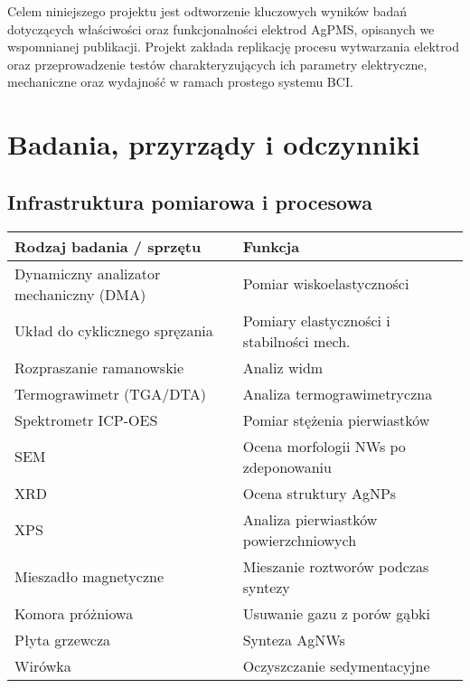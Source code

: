 \documentclass[12pt,a4paper]{article}
\begin{document}
Celem niniejszego projektu jest odtworzenie kluczowych wyników badań dotyczących właściwości oraz funkcjonalności elektrod AgPMS, opisanych we wspomnianej publikacji. Projekt zakłada replikację procesu wytwarzania elektrod oraz przeprowadzenie testów charakteryzujących ich parametry elektryczne, mechaniczne oraz wydajność w ramach prostego systemu BCI.

\section{Badania, przyrządy i odczynniki}
\subsection{Infrastruktura pomiarowa i procesowa}
\begin{table}[H]
    \centering
    \begin{tabular}{@{}ll@{}}
        \toprule
        \textbf{Rodzaj badania / sprzętu}       & \textbf{Funkcja}                          \\
        \midrule
        Dynamiczny analizator mechaniczny (DMA) & Pomiar wiskoelastyczności                 \\
        Układ do cyklicznego spręzania          & Pomiary elastyczności i stabilności mech. \\
        Rozpraszanie ramanowskie                & Analiz widm                               \\
        Termograwimetr (TGA/DTA)                & Analiza termograwimetryczna               \\
        Spektrometr ICP-OES                     & Pomiar stężenia pierwiastków              \\
        SEM                                     & Ocena morfologii NWs po zdeponowaniu      \\
        XRD                                     & Ocena struktury AgNPs                     \\
        XPS                                     & Analiza pierwiastków powierzchniowych     \\
        \midrule
        Mieszadło magnetyczne                   & Mieszanie roztworów podczas syntezy       \\
        Komora próżniowa                        & Usuwanie gazu z porów gąbki               \\
        Płyta grzewcza                          & Synteza AgNWs                             \\
        Wirówka                                 & Oczyszczanie sedymentacyjne               \\
        \bottomrule
    \end{tabular}
\end{table}
\end{document}
